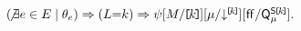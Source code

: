 \begin{enumerate}
\begin{math}
    (\!\not\exists\aEv\in\aEvs \suchthat \cForm_\aEv)
    \limplies (\cExp{=}\dVal)
    \limplies {
      \bForm
      [\aExp/\REF{\dVal}]
      \DS{\REF{\dVal}}{\amode}
      [\FALSE/\QS{\REF{\dVal}}{\amode}]
    }.
  \end{math}
\end{enumerate}
